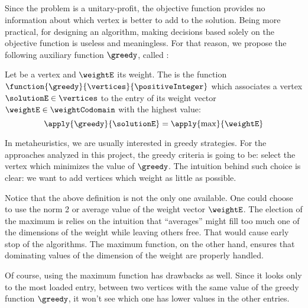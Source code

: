\subsection{\greedyCriteriaText}

Since the problem is a unitary-profit, the objective function provides no information about which vertex is better to add to the solution. Being more practical, for designing an algorithm, making decisions based solely on the objective function is useless and meaningless. For that reason, we propose the following auxiliary function $\greedy$, called \greedyCriteriaText:

\begin{defn}[\greedyCriteriaText]
    \label{def:greedy-criteria}
    Let  be a vertex and $\weightE$ its weight. The \greedyCriteriaText is the function $\function{\greedy}{\vertices}{\positiveInteger}$ which associates a vertex $\solutionE \in \vertices$ to the entry of its weight vector $\weightE \in \weightCodomain$ with the highest value:
    \begin{equation}
        \label{eq:greedy-criteria}
        \apply{\greedy}{\solutionE} = \apply{\max}{\weightE}
    \end{equation}
\end{defn}

In metaheuristics, we are usually interested in greedy strategies. For the approaches analyzed in this project, the greedy criteria is going to be: select the vertex which minimizes the value of $\greedy$. The intuition behind such choice is clear: we want to add vertices which weight as little as possible.

Notice that the above definition is not the only one available. One could choose to use the norm 2 or average value of the weight vector $\weightE$. The election of the maximum is relies on the intuition that ``averages'' might fill too much one of the dimensions of the weight while leaving others free. That would cause early stop of the algorithms. The maximum function, on the other hand, ensures that dominating values of the dimension of the weight are properly handled.

Of course, using the maximum function has drawbacks as well. Since it looks only to the most loaded entry, between two vertices with the same value of the greedy function $\greedy$, it won't see which one has lower values in the other entries.
